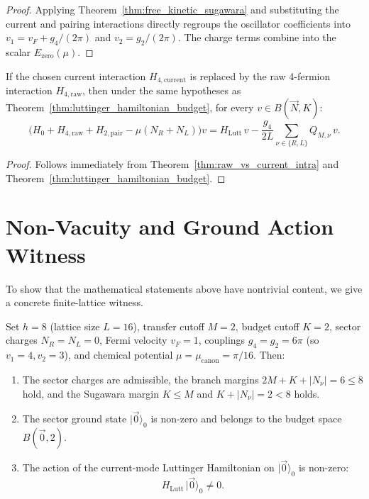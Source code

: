 \begin{proof}
Applying Theorem~\ref{thm:free_kinetic_sugawara} and substituting the current and pairing interactions directly regroups the oscillator coefficients into $v_1=v_F+g_4/(2\pi)$ and $v_2=g_2/(2\pi)$. The charge terms combine into the scalar $E_{\mathrm{zero}}(\mu)$.
\end{proof}

\begin{theorem}
\label{thm:luttinger_raw_budget}
If the chosen current interaction $H_{4, \mathrm{current}}$ is replaced by the raw 4-fermion interaction $H_{4, \mathrm{raw}}$, then under the same hypotheses as Theorem~\ref{thm:luttinger_hamiltonian_budget}, for every $v \in B(\vec{N}, K)$:
\begin{equation}
\Big( H_0 + H_{4, \mathrm{raw}} + H_{2, \mathrm{pair}} - \mu(N_R + N_L) \Big) v = H_{\mathrm{Lutt}} \, v - \frac{g_4}{2L} \sum_{\nu \in \{R, L\}} Q_{M, \nu} \, v.
\end{equation}
\end{theorem}

\begin{proof}
Follows immediately from Theorem~\ref{thm:raw_vs_current_intra} and Theorem~\ref{thm:luttinger_hamiltonian_budget}.
\end{proof}

\section{Non-Vacuity and Ground Action Witness}

To show that the mathematical statements above have nontrivial content, we give a concrete finite-lattice witness.

\begin{proposition}
\label{prop:concrete_witness}
Set $h = 8$ (lattice size $L = 16$), transfer cutoff $M = 2$, budget cutoff $K = 2$, sector charges $N_R = N_L = 0$, Fermi velocity $v_F = 1$, couplings $g_4 = g_2 = 6\pi$ (so $v_1 = 4, v_2 = 3$), and chemical potential $\mu = \mu_{\mathrm{canon}} = \pi / 16$.
Then:
\begin{enumerate}
    \item The sector charges are admissible, the branch margins $2M + K + |N_\nu| = 6 \le 8$ hold, and the Sugawara margin $K \le M$ and $K + |N_\nu| = 2 < 8$ holds.
    \item The sector ground state $|\vec{0}\rangle_0$ is non-zero and belongs to the budget space $B(\vec{0}, 2)$.
    \item The action of the current-mode Luttinger Hamiltonian on $|\vec{0}\rangle_0$ is non-zero:
    \begin{equation}
    H_{\mathrm{Lutt}} \, |\vec{0}\rangle_0 \neq 0.
    \end{equation}
\end{enumerate}
\end{proposition}

